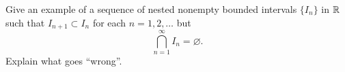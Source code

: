 \begin{exercise}
  \label{ex:hw02:nested-bounded-intervals}
  Give an example of a sequence of nested nonempty bounded intervals
  $\{I_n\}$ in $\mathbb{R}$ such that $I_{n+1}\subset I_n$ for each
  $n=1,2,\ldots$ but
  \[
    \bigcap_{n=1}^{\infty} I_n=\varnothing.
  \]
  Explain what goes ``wrong''.
\end{exercise}
